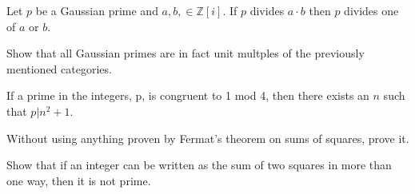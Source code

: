 \begin{theorem}
  Let \(p\) be a Gaussian prime and \(a, b, \in \mathbb{Z}[i] \). If \(p\) divides \( a \cdot b\) then \(p\) divides one of \(a\) or \(b\).
\end{theorem}

\begin{problem}
  Show that all Gaussian primes are in fact unit multples of the previously mentioned categories.
\end{problem}

\begin{theorem}
  If a prime in the integers, p, is congruent to 1 mod 4, then there exists an \(n\) such that \(p | n^2 + 1\).
\end{theorem}


\begin{problem}
  Without using anything proven by Fermat's theorem on sums of squares, prove it.
\end{problem}

\begin{problem}
  Show that if an integer can be written as the sum of two squares in more than one way, then it is not prime.
\end{problem}


%   

























